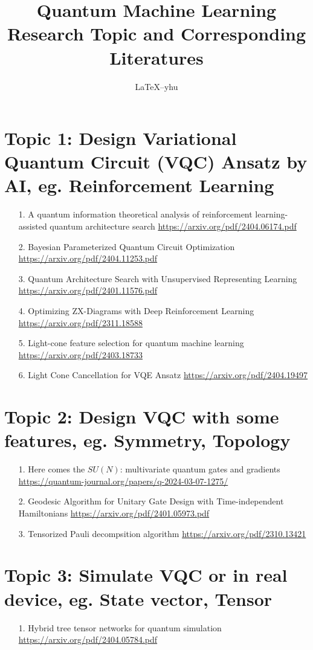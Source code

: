 \documentclass[12pt, oneside]{article}   	%
\title{Quantum Machine Learning Research Topic and Corresponding Literatures}
\author{\LaTeX--yhu}
\date{}							%
\begin{document}
\maketitle
\section{Topic 1: Design Variational Quantum Circuit (VQC) Ansatz by AI, eg. Reinforcement Learning}
\begin{itemize}
\item[1. ] A quantum information theoretical analysis of reinforcement	 learning-assisted quantum architecture search \url{https://arxiv.org/pdf/2404.06174.pdf}
\item[2. ] Bayesian Parameterized Quantum Circuit Optimization \url{https://arxiv.org/pdf/2404.11253.pdf}
\item[3. ] Quantum Architecture Search with Unsupervised Representing Learning \url{https://arxiv.org/pdf/2401.11576.pdf}
\item[4. ] Optimizing ZX-Diagrams with Deep Reinforcement Learning \url{https://arxiv.org/pdf/2311.18588} 
\item[5. ] Light-cone feature selection for quantum machine learning \url{https://arxiv.org/pdf/2403.18733} 
\item[6. ] Light Cone Cancellation for VQE Ansatz \url{https://arxiv.org/pdf/2404.19497} 
\end{itemize}



\section{Topic 2: Design VQC with some features, eg. Symmetry, Topology}
\begin{itemize}
\item[1. ] Here comes the $SU(N)$: multivariate quantum gates and gradients \url{https://quantum-journal.org/papers/q-2024-03-07-1275/}
\item [2. ]  Geodesic Algorithm for Unitary Gate Design with Time-independent Hamiltonians \url{https://arxiv.org/pdf/2401.05973.pdf}
\item [3. ] Tensorized Pauli decompsition algorithm \url{https://arxiv.org/pdf/2310.13421}
\end{itemize}

\section{Topic 3: Simulate VQC or in real device, eg. State vector, Tensor}
\begin{itemize}
\item[1.] Hybrid tree tensor networks for quantum simulation \url{https://arxiv.org/pdf/2404.05784.pdf}
\end{itemize}
\end{document}
